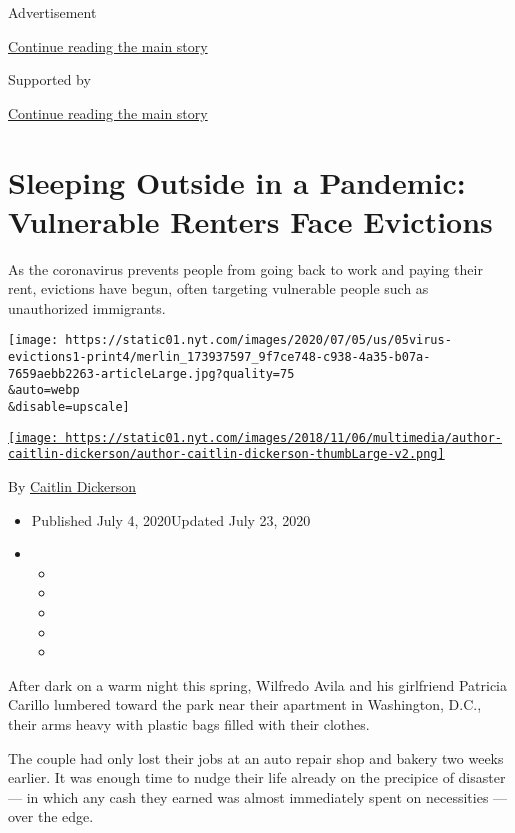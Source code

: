 Advertisement

\protect\hyperlink{after-top}{Continue reading the main story}

Supported by

\protect\hyperlink{after-sponsor}{Continue reading the main story}

\hypertarget{sleeping-outside-in-a-pandemic-vulnerable-renters-face-evictions}{%
\section{Sleeping Outside in a Pandemic: Vulnerable Renters Face
Evictions}\label{sleeping-outside-in-a-pandemic-vulnerable-renters-face-evictions}}

As the coronavirus prevents people from going back to work and paying
their rent, evictions have begun, often targeting vulnerable people such
as unauthorized immigrants.

\texttt{[image: https://static01.nyt.com/images/2020/07/05/us/05virus-evictions1-print4/merlin\_173937597\_9f7ce748-c938-4a35-b07a-7659aebb2263-articleLarge.jpg?quality=75\\\&auto=webp\\\&disable=upscale]}

\href{https://www.nytimes.com/by/caitlin-dickerson}{\texttt{[image: https://static01.nyt.com/images/2018/11/06/multimedia/author-caitlin-dickerson/author-caitlin-dickerson-thumbLarge-v2.png]}}

By \href{https://www.nytimes.com/by/caitlin-dickerson}{Caitlin
Dickerson}

\begin{itemize}
\item
  Published July 4, 2020Updated July 23, 2020
\item
  \begin{itemize}
  \item
  \item
  \item
  \item
  \item
  \end{itemize}
\end{itemize}

After dark on a warm night this spring, Wilfredo Avila and his
girlfriend Patricia Carillo lumbered toward the park near their
apartment in Washington, D.C., their arms heavy with plastic bags filled
with their clothes.

The couple had only lost their jobs at an auto repair shop and bakery
two weeks earlier. It was enough time to nudge their life already on the
precipice of disaster --- in which any cash they earned was almost
immediately spent on necessities --- over the edge.

